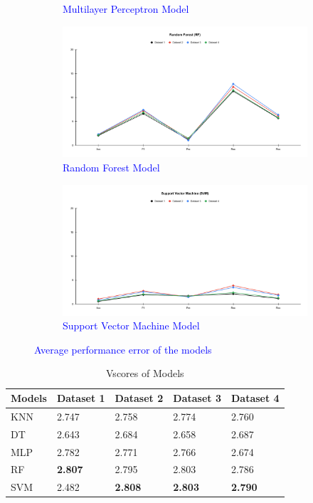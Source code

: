 \documentclass[a4paper,fleqn]{cas-dc}
\newcommand{\rowstyle}[1]{\gdef\currentrowstyle{#1}#1\ignorespaces}  %
\newcommand{\bfrow}{\rowstyle{\bfseries}}  %
\newcommand{\responsemodsm}[1]{\textcolor{blue}{#1}}
\newcommand{\captionb}[1]{\caption{\responsemodsm{#1}}}
\begin{document}
\begin{figure}[H]
\begin{subfigure}{\columnwidth}
        \captionb{Multilayer Perceptron Model}\label{fig:performance_delta_mlp}
    \end{subfigure}
    \begin{subfigure}{\columnwidth}
        \includegraphics[width=0.9\columnwidth]{delta_RF.pdf}
        \captionb{Random Forest Model}\label{fig:performance_delta_rf}
    \end{subfigure}
    \begin{subfigure}{\columnwidth}
        \includegraphics[width=0.9\columnwidth]{delta_SVM.pdf}
        \captionb{Support Vector Machine Model}\label{fig:performance_delta_svm}
    \end{subfigure}
    \captionb{Average performance error of the models}\label{fig:average_error}
\end{figure}

\clearpage
\begin{table}[H]
    \caption{Vscores of Models}\label{tab:vscores_models}
    \begin{tabular*}{\tblwidth}{@{}FKKKK@{}}
        \toprule
        \bfrow Models & Dataset 1 & Dataset 2 & Dataset 3 & Dataset 4 \\
        \midrule
        KNN & 2.747 & 2.758 & 2.774 & 2.760 \\
        DT & 2.643 & 2.684 & 2.658 & 2.687 \\
        MLP & 2.782 & 2.771 & 2.766 & 2.674 \\
        RF & \textbf{2.807} & 2.795 & 2.803 & 2.786 \\
        SVM & 2.482 & \textbf{2.808} & \textbf{2.803} & \textbf{2.790} \\
        \bottomrule
    \end{tabular*}
\end{table}
\end{document}
